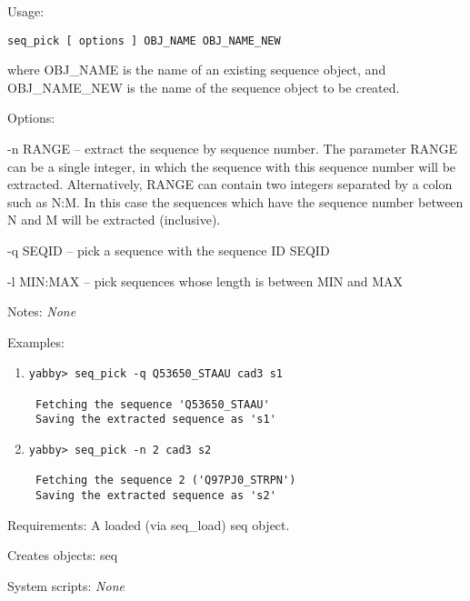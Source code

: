 \begin{description}


\item{Usage:}

{\tt seq\_pick [ options ] OBJ\_NAME OBJ\_NAME\_NEW}

 where OBJ\_NAME is the name of an existing sequence object,
 and OBJ\_NAME\_NEW is the name of the sequence object to
 be created.


\item{Options:}
\begin{description}
\item -n RANGE -- extract the sequence by sequence number. The
 parameter RANGE can be a single integer, in which the
 sequence with this sequence number will be extracted.
 Alternatively, RANGE can contain two integers separated
 by a colon such as N:M. In this case the sequences which
 have the sequence number between N and M will be extracted
 (inclusive).
\item -q SEQID -- pick a sequence with the sequence ID SEQID
\item -l MIN:MAX -- pick sequences whose length is between MIN and MAX
\end{description}


\item{Notes:} {\em None}


\item{Examples:}
\begin{enumerate}

\item
\begin{verbatim}
yabby> seq_pick -q Q53650_STAAU cad3 s1

 Fetching the sequence 'Q53650_STAAU'
 Saving the extracted sequence as 's1'

\end{verbatim}

\item
\begin{verbatim}
yabby> seq_pick -n 2 cad3 s2

 Fetching the sequence 2 ('Q97PJ0_STRPN')
 Saving the extracted sequence as 's2'

\end{verbatim}

\end{enumerate}


\item{Requirements:} A loaded (via seq\_load) seq object.


\item{Creates objects:} seq


\item{System scripts:} {\em None}

\end{description}

